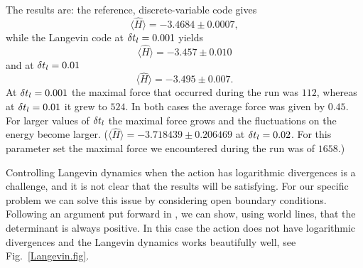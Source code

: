 The results are: the reference, discrete-variable code gives
\begin{equation}
 \langle  \hat{H} \rangle  =  -3.4684 \pm 0.0007,
\end{equation} 
while the Langevin code at $ \delta t_{l} = 0.001$  yields 
\begin{equation}
 \langle  \hat{H} \rangle  =  -3.457 \pm 0.010 
\end{equation} 
and at $ \delta t_{l} = 0.01$
\begin{equation}
 \langle  \hat{H} \rangle  = -3.495 \pm 0.007\text{.}
\end{equation} 
 At $ \delta t_{l} = 0.001$   the maximal force that occurred during the run was 
$ 112$, whereas at $ \delta t_{l} = 0.01$ it grew to $524$.    In both cases the average force was given by $0.45$.   For larger values of  $ \delta t_{l} $ the maximal force grows and the fluctuations on the energy become  larger.  
($ \langle  \hat{H} \rangle  =  -3.718439    \pm   0.206469 $  at $ \delta t_{l} = 0.02$. For this parameter set  the maximal force we encountered during the run was of $1658$.)

Controlling Langevin dynamics when the action has logarithmic divergences is a challenge, and it is not clear  that the results will be satisfying.  For our specific problem we can solve this issue by considering open boundary conditions. Following an argument put forward in \cite{Assaad07}, we can show, using world lines, that the determinant is always positive.   In this case the  action does not  have logarithmic divergences and the Langevin dynamics works beautifully well, see Fig.~\ref{Langevin.fig}. 

